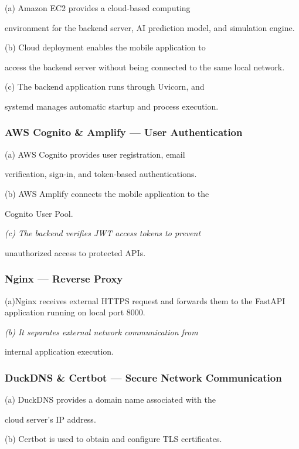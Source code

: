 \documentclass[conference]{IEEEtran}
\begin{document}
(a) Amazon EC2 provides a cloud-based computing

environment for the backend server, AI prediction model, and simulation engine.

(b) Cloud deployment enables the mobile application to

access the backend server without being connected to the same local network.

(c) The backend application runs through Uvicorn, and

systemd manages automatic startup and process execution.

\subsubsection{AWS Cognito \& Amplify --- User Authentication \cite{ref15,ref16}}

(a) AWS Cognito provides user registration, email

verification, sign-in, and token-based authentications.

(b) AWS Amplify connects the mobile application to the

Cognito User Pool.

\emph{(c) The backend verifies JWT access tokens to prevent}

unauthorized access to protected APIs.

\subsubsection{Nginx --- Reverse Proxy \cite{ref17}}

(a)Nginx receives external HTTPS request and forwards them to the FastAPI application running on local port 8000.

\emph{(b) It separates external network communication from}

internal application execution.

\subsubsection{DuckDNS \& Certbot --- Secure Network Communication}

\cite{ref19,ref20}

(a) DuckDNS provides a domain name associated with the

cloud server's IP address.

(b) Certbot is used to obtain and configure TLS certificates.
\end{document}
